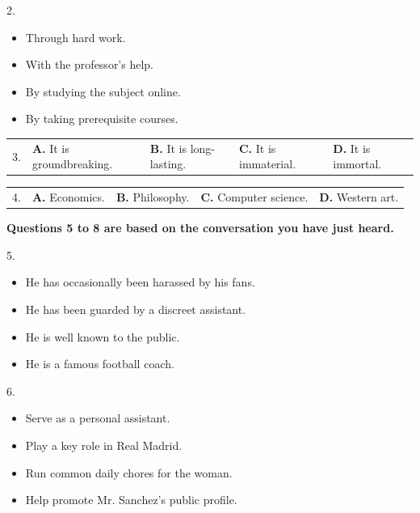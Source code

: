 \documentclass[UTF8,11pt]{ctexart}
\begin{document}
2.


\begin{itemize}[leftmargin=2em,itemsep=.2em,topsep=.4em]\item[A.] Through hard work.
\item[B.] With the professor’s help.
\item[C.] By studying the subject online.
\item[D.] By taking prerequisite courses.
\end{itemize}

\noindent\begin{tabularx}{\linewidth}{@{}lXXXX@{}}3. & \textbf{A.} It is groundbreaking. & \textbf{B.} It is long-lasting. & \textbf{C.} It is immaterial. & \textbf{D.} It is immortal.\\\end{tabularx}\par

\noindent\begin{tabularx}{\linewidth}{@{}lXXXX@{}}4. & \textbf{A.} Economics. & \textbf{B.} Philosophy. & \textbf{C.} Computer science. & \textbf{D.} Western art.\\\end{tabularx}\par

\textbf{Questions 5 to 8 are based on the conversation you have just heard.}


5.


\begin{itemize}[leftmargin=2em,itemsep=.2em,topsep=.4em]\item[A.] He has occasionally been harassed by his fans.
\item[B.] He has been guarded by a discreet assistant.
\item[C.] He is well known to the public.
\item[D.] He is a famous football coach.
\end{itemize}

6.


\begin{itemize}[leftmargin=2em,itemsep=.2em,topsep=.4em]\item[A.] Serve as a personal assistant.
\item[B.] Play a key role in Real Madrid.
\item[C.] Run common daily chores for the woman.
\item[D.] Help promote Mr. Sanchez’s public profile.
\end{itemize}
\end{document}
